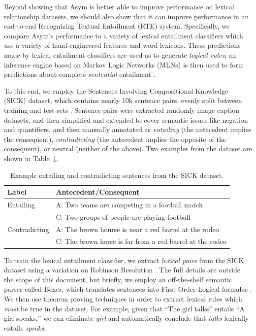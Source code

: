 \documentclass[12pt]{article}
\begin{document}
Beyond showing that Asym is better able to improve performance on lexical
relationship datasets, we should also show that it can improve performance
in an end-to-end Recognizing Textual Entailment (RTE) system. Specifically, we compare Asym's performance
to a variety of lexical entailment classifiers which use a variety of
hand-engineered features and word lexicons.  These predictions made by lexical
entailment classifiers are used as to generate {\em logical rules}; an inference
engine based on Markov Logic Networks (MLNs) is then used to form predictions
about complete {\em sentential} entailment \cite{beltagy:2016:cl}.

To this end, we employ the Sentences Involving Compositional Knowledge (SICK)
dataset, which contains nearly 10k sentence pairs, evenly split between
training and test sets \cite{marelli:2014:semeval}. Sentence pairs were
extracted randomly image caption datasets, and then simplified and extended to
cover semantic issues like negation and quantifiers, and then manually
annotated as {\em entailing} (the antecedent implies the consequent), {\em
contradicting} (the antecedent implies the opposite of the consequent), or
neutral (neither of the above). Two examples from the dataset are shown in
Table~\ref{tab:sickexample}.

\begin{table}
  \centering
  \begin{tabular}{|ll|}
    \hline
    {\bf Label} & {\bf Antecedent/Consequent}\\
    \hline
    Entailing & A: Two teams are competing in a football match\\
    & C: Two groups of people are playing football\\
    \hline
    Contradicting & A: The brown hourse is near a red barrel at the rodeo\\
    & C: The brown horse is far from a red barrel at the rodeo\\
    \hline
  \end{tabular}
  \caption{Example entailing and contradicting sentences from the SICK dataset.}
  \label{tab:sickexample}
\end{table}

To train the lexical entailment classifier, we extract {\em lexical pairs} from
the SICK dataset using a variation on Robinson Resolution \cite{robinson:1965:jacm}. The
full details are outside the scope of this document, but briefly, we employ
an off-the-shelf semantic parser called Boxer, which translates sentences into
First Order Logical formulas \cite{bos:2008:step}. We then use theorem proving
techniques in order to extract lexical rules which {\em must} be true in the dataset.
For example, given that ``The girl talks'' entails ``A girl speaks,'' we can
eliminate {\em girl} and automatically conclude that {\em talks} lexically
entails {\em speaks}.
\end{document}
